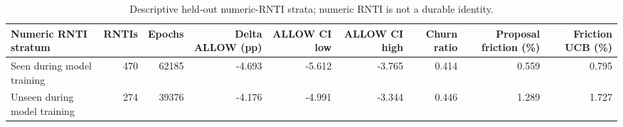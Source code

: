 \begin{table}[t]
\centering
\scriptsize
\caption{Descriptive held-out numeric-RNTI strata; numeric RNTI is not a durable identity.}
\label{tab:rnti-strata}
\begin{tabular}{lrrrrrrrr}
\hline
Numeric RNTI stratum & RNTIs & Epochs & Delta ALLOW (pp) & ALLOW CI low & ALLOW CI high & Churn ratio & Proposal friction (\%) & Friction UCB (\%) \\
\hline
Seen during model training & 470 & 62185 & -4.693 & -5.612 & -3.765 & 0.414 & 0.559 & 0.795 \\
Unseen during model training & 274 & 39376 & -4.176 & -4.991 & -3.344 & 0.446 & 1.289 & 1.727 \\
\hline
\end{tabular}
\end{table}
